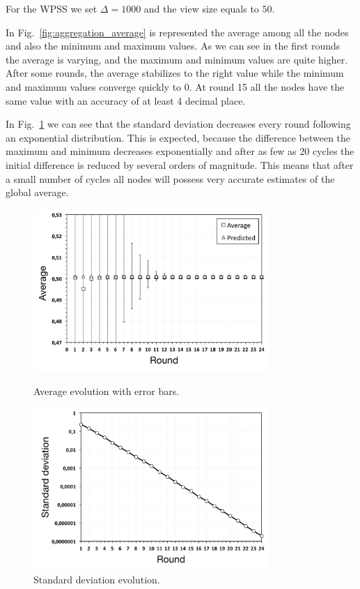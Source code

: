 For the WPSS we set $\Delta = 1000$ and the view size equals to $50$. 

In Fig.~\ref{fig:aggregation_average} is represented the average among all the nodes and also the minimum and maximum values. As we can see in the first rounds the average is varying, and the maximum and minimum values are quite higher. After some rounds, the average stabilizes to the right value while the minimum and maximum values converge quickly to 0. At round 15 all the nodes have the same value with an accuracy of at least 4 decimal place. 

In Fig.~\ref{fig:aggregation_standard_deviation} we can see that the standard deviation decreases every round following an exponential distribution. This is expected, because the difference between the maximum and minimum decreases exponentially and after as few as 20 cycles the initial difference is reduced by several orders of magnitude. This means that after a small number of cycles all nodes will possess very accurate estimates of the global average.

\begin{figure}[p]
\centering
\includegraphics[keepaspectratio=true, width=0.8\textwidth]{images/aggregation_average}
\caption{Average evolution with error bars.}
\label{fig:aggregation_average}
\includegraphics[keepaspectratio=true, width=0.8\textwidth]{images/aggregation_standard_deviation}
\caption{Standard deviation evolution.}
\label{fig:aggregation_standard_deviation}
\end{figure}

